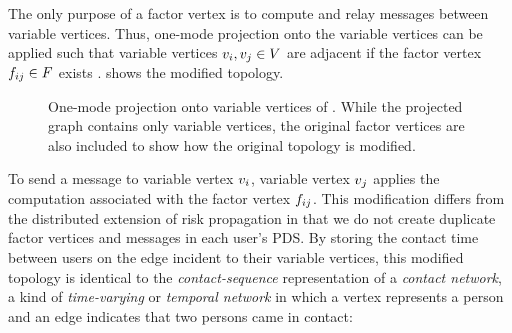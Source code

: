 The only purpose of a factor vertex is to compute and relay messages between variable vertices. Thus, one-mode projection onto the variable vertices can be applied such that variable vertices $\vVariable[i],\vVariable[j] \in \vVariables$ are adjacent if the factor vertex $\vFactor[ij] \in \vFactors$ exists \cite{Zhou2007}.  shows the modified topology.
%
\begin{figure}[htbp]
\centering
{}
\caption[One-mode projection of a factor graph]{One-mode projection
onto variable vertices of . While the projected graph
contains only variable vertices, the original factor vertices are also included
to show how the original topology is modified.}
\label{fig:projected}
\end{figure}
%
To send a message to variable vertex $\vVariable[i]$, variable vertex $\vVariable[j]$ applies the computation associated with the factor vertex $\vFactor[ij]$. This modification differs from the distributed extension of risk propagation \cite{Ayday2021} in that we do not create duplicate factor vertices and messages in each user's PDS. By storing the contact time between users on the edge incident to their variable vertices, this modified topology is identical to the \emph{contact-sequence} representation of a \emph{contact network}, a kind of \emph{time-varying} or \emph{temporal network} in which a vertex represents a person and an edge indicates that two persons came in contact:

